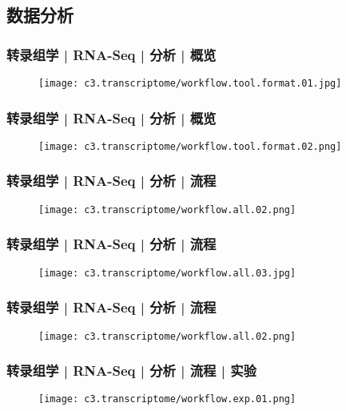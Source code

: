 \subsection{数据分析}
\begin{frame}
  \frametitle{转录组学 | RNA-Seq | 分析 | 概览}
  \begin{figure}
    \centering
    \texttt{[image: c3.transcriptome/workflow.tool.format.01.jpg]}
  \end{figure}
\end{frame}

\begin{frame}
  \frametitle{转录组学 | RNA-Seq | 分析 | 概览}
  \begin{figure}
    \centering
    \texttt{[image: c3.transcriptome/workflow.tool.format.02.png]}
  \end{figure}
\end{frame}

\begin{frame}
  \frametitle{转录组学 | RNA-Seq | 分析 | 流程}
  \begin{figure}
    \centering
    \texttt{[image: c3.transcriptome/workflow.all.02.png]}
  \end{figure}
\end{frame}

\begin{frame}
  \frametitle{转录组学 | RNA-Seq | 分析 | 流程}
  \begin{figure}
    \centering
    \texttt{[image: c3.transcriptome/workflow.all.03.jpg]}
  \end{figure}
\end{frame}

\begin{frame}
  \frametitle{转录组学 | RNA-Seq | 分析 | 流程}
  \begin{figure}
    \centering
    \texttt{[image: c3.transcriptome/workflow.all.02.png]}
  \end{figure}
\end{frame}

\begin{frame}
  \frametitle{转录组学 | RNA-Seq | 分析 | 流程 | 实验}
  \begin{figure}
    \centering
    \texttt{[image: c3.transcriptome/workflow.exp.01.png]}
  \end{figure}
\end{frame}

